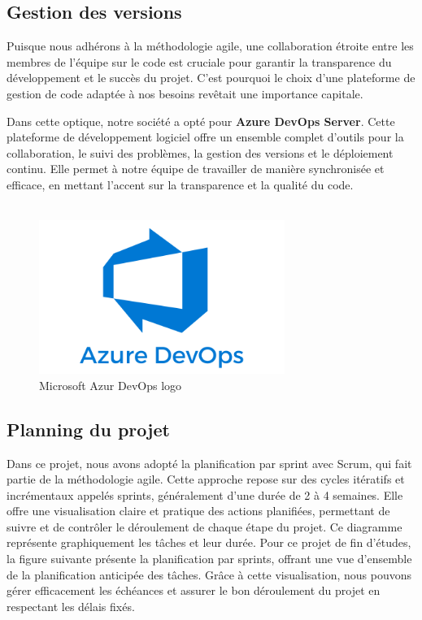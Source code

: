 \subsection{Gestion des versions}

Puisque nous adhérons à la méthodologie agile, une collaboration étroite entre les membres de l'équipe sur le code est cruciale pour garantir la transparence du développement et le succès du projet. C'est pourquoi le choix d'une plateforme de gestion de code adaptée à nos besoins revêtait une importance capitale.

Dans cette optique, notre société a opté pour \textbf{Azure DevOps Server}. Cette plateforme de développement logiciel offre un ensemble complet d'outils pour la collaboration, le suivi des problèmes, la gestion des versions et le déploiement continu. Elle permet à notre équipe de travailler de manière synchronisée et efficace, en mettant l'accent sur la transparence et la qualité du code.
\\
\\
\begin{figure}[H]
    \centering
    \includegraphics[width=8cm]{Figures/azur.png}
    \caption{Microsoft Azur DevOps logo}
\end{figure}


\subsection{Planning du projet}

\hspace{\parindent}Dans ce projet, nous avons adopté la planification par sprint avec Scrum, qui fait partie de la méthodologie agile. Cette approche repose sur des cycles itératifs et incrémentaux appelés sprints, généralement d'une durée de 2 à 4 semaines. Elle offre une visualisation claire et pratique des actions planifiées, permettant de suivre et de contrôler le déroulement de chaque étape du projet. Ce diagramme représente graphiquement les tâches et leur durée. Pour ce projet de fin d’études, la figure suivante présente la planification par sprints, offrant une vue d'ensemble de la planification anticipée des tâches. Grâce à cette visualisation, nous pouvons gérer efficacement les échéances et assurer le bon déroulement du projet en respectant les délais fixés.

